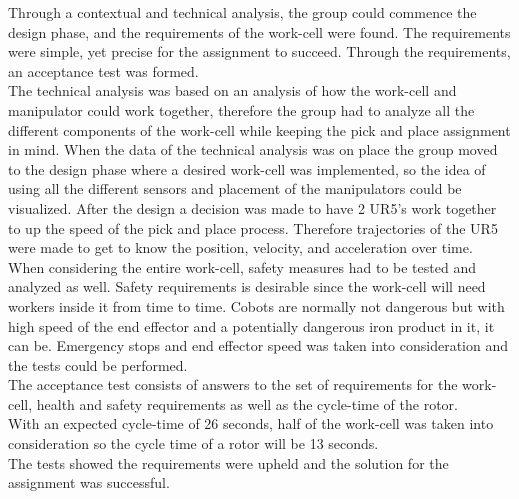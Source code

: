 Through a contextual and technical analysis, the group could commence the design phase, and the requirements of the work-cell were found. The requirements were simple, yet precise for the assignment to succeed. Through the requirements, an acceptance test was formed.\\
The technical analysis was based on an analysis of how the work-cell and manipulator could work together, therefore the group had to analyze all the different components of the work-cell while keeping the pick and place assignment in mind. When the data of the technical analysis was on place the group moved to the design phase where a desired work-cell was implemented, so the idea of using all the different sensors and placement of the manipulators could be visualized. After the design a decision was made to have 2 UR5's work together to up the speed of the pick and place process. Therefore trajectories of the UR5 were made to get to know the position, velocity, and acceleration over time.\\
When considering the entire work-cell, safety measures had to be tested and analyzed as well. Safety requirements is desirable since the work-cell will need workers inside it from time to time. Cobots are normally not dangerous but with high speed of the end effector and a potentially dangerous iron product in it, it can be. Emergency stops and end effector speed was taken into consideration and the tests could be performed.\\
The acceptance test consists of answers to the set of requirements for the work-cell, health and safety requirements as well as the cycle-time of the rotor.\\
With an expected cycle-time of 26 seconds, half of the work-cell was taken into consideration so the cycle time of a rotor will be 13 seconds.\\
The tests showed the requirements were upheld and the solution for the assignment was successful. \\








